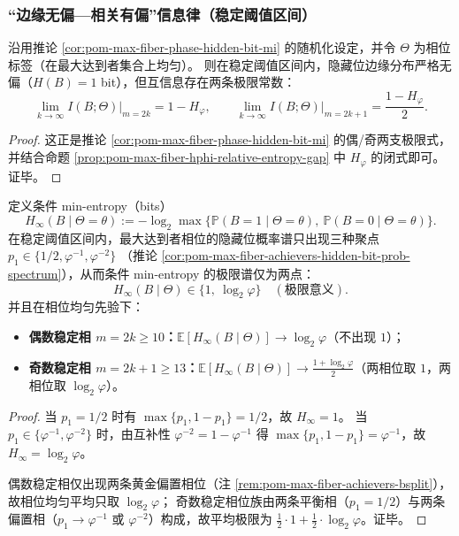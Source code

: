 \subsubsection{“边缘无偏—相关有偏”信息律（稳定阈值区间）}

\begin{corollary}[最大纤维族上的边缘无偏与互信息缺口]\label{cor:pom-max-fiber-hidden-bit-mi-gap}
沿用推论 \ref{cor:pom-max-fiber-phase-hidden-bit-mi} 的随机化设定，并令 \(\Theta\) 为相位标签（在最大达到者集合上均匀）。
则在稳定阈值区间内，隐藏位边缘分布严格无偏（\(H(B)=1\) bit），但互信息存在两条极限常数：
\[
\boxed{\;
\lim_{k\to\infty} I(B;\Theta)\Big|_{m=2k}=1-H_\varphi,\qquad
\lim_{k\to\infty} I(B;\Theta)\Big|_{m=2k+1}=\frac{1-H_\varphi}{2}. \;}
\]
\end{corollary}

\begin{proof}
这正是推论 \ref{cor:pom-max-fiber-phase-hidden-bit-mi} 的偶/奇两支极限式，
并结合命题 \ref{prop:pom-max-fiber-hphi-relative-entropy-gap} 中 \(H_\varphi\) 的闭式即可。证毕。
\end{proof}

\begin{proposition}\label{prop:pom-max-fiber-hidden-bit-minentropy-spectrum}
定义条件 min-entropy（bits）
\[
H_\infty(B\mid \Theta=\theta):=-\log_2\max\{\mathbb{P}(B=1\mid\Theta=\theta),\ \mathbb{P}(B=0\mid\Theta=\theta)\}.
\]
在稳定阈值区间内，最大达到者相位的隐藏位概率谱只出现三种聚点
\(
p_1\in\{1/2,\varphi^{-1},\varphi^{-2}\}
\)
（推论 \ref{cor:pom-max-fiber-achievers-hidden-bit-prob-spectrum}），从而条件 min-entropy 的极限谱仅为两点：
\[
\boxed{\;
H_\infty(B\mid \Theta)\in\{1,\ \log_2\varphi\}\quad(\text{极限意义}).\;}
\]
并且在相位均匀先验下：
\begin{itemize}
  \item \textbf{偶数稳定相 \(m=2k\ge 10\)：}\(\mathbb{E}[H_\infty(B\mid\Theta)]\to \log_2\varphi\)（不出现 \(1\)）；
  \item \textbf{奇数稳定相 \(m=2k+1\ge 13\)：}\(\mathbb{E}[H_\infty(B\mid\Theta)]\to \frac{1+\log_2\varphi}{2}\)（两相位取 \(1\)，两相位取 \(\log_2\varphi\)）。
\end{itemize}
\end{proposition}

\begin{proof}
当 \(p_1=1/2\) 时有 \(\max\{p_1,1-p_1\}=1/2\)，故 \(H_\infty=1\)。
当 \(p_1\in\{\varphi^{-1},\varphi^{-2}\}\) 时，由互补性 \(\varphi^{-2}=1-\varphi^{-1}\) 得
\(\max\{p_1,1-p_1\}=\varphi^{-1}\)，故 \(H_\infty=\log_2\varphi\)。
\par
偶数稳定相仅出现两条黄金偏置相位（注 \ref{rem:pom-max-fiber-achievers-bsplit}），故相位均匀平均只取 \(\log_2\varphi\)；
奇数稳定相位族由两条平衡相（\(p_1=1/2\)）与两条偏置相（\(p_1\to\varphi^{-1}\) 或 \(\varphi^{-2}\)）构成，故平均极限为 \(\frac12\cdot 1+\frac12\cdot\log_2\varphi\)。证毕。
\end{proof}

